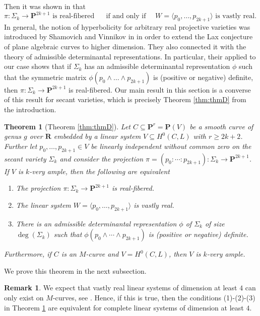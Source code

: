 \documentclass[12pt]{amsart}
\newcounter{conj}
\newcounter{thmcounter}
\numberwithin{equation}{section}
\numberwithin{thmcounter}{section}
\newtheorem{theorem}[thmcounter]{Theorem}
\theoremstyle{definition}
\newtheorem{remark}[thmcounter]{Remark}
\theoremstyle{claim}
\newcommand{\nR}{\mathbf{R}}
\newcommand{\nP}{\mathbf{P}}
\begin{document}
Then it was shown in \cite[Theorem 4.6]{kummersinn} that 
\[ \pi\colon \Sigma_k \to \nP^{2k+1} \text{ is real-fibered } \quad  \text{ if and only if } \quad  W=\langle p_0,\ldots,p_{2k+1} \rangle \text{ is vastly real. } \]
In general, the notion of hyperbolicity for arbitrary real projective varieties was introduced by Shamovich and Vinnikov in \cite{shamovichvinnikov} in order to extend the Lax conjecture of plane algebraic curves to higher dimension. They also connected it with the theory of admissible determinantal representations. In particular, their \cite[Proposition 3.12]{shamovichvinnikov} applied to our case shows that if $\Sigma_k$ has an admissible determinantal representation $\phi$ such that the symmetric matrix $\phi(p_0\wedge \ldots \wedge p_{2k+1})$ is (positive or negative) definite, then $\pi\colon \Sigma_k\to \nP^{2k+1}$ is real-fibered. Our main result in this section is a converse of this result for secant varieties, which is precisely Theorem \ref{thm:thmD} from the introduction.

\begin{theorem}[Theorem \ref{thm:thmD}]\label{thm:definitedetrep}
	Let $C\subseteq \nP^r = \nP(V)$ be a smooth curve of genus $g$ over $\nR$ embedded by a linear system $V\subseteq H^0(C,L)$ with $r\geq 2k+2$. Further let $p_0,\ldots,p_{2k+1}\in V$ be linearly independent without common zero on the secant variety $\Sigma_k$ and consider the projection $\pi = (p_0:\cdots:p_{2k+1})\colon \Sigma_k\to \nP^{2k+1}$. If $V$ is $k$-very ample, then the following are equivalent
	\begin{enumerate}
		\item The projection $\pi\colon \Sigma_k \rightarrow \nP^{2k+1}$ is real-fibered.
		\item The linear system $W=\langle p_0,\ldots,p_{2k+1} \rangle$ is vastly real.
		\item There is an admissible determinantal representation $\phi$ of $\Sigma_k$ of size $\deg(\Sigma_k)$ such that $\phi(p_0\wedge \cdots \wedge p_{2k+1})$ is (positive or negative) definite. 
	\end{enumerate}
Furthermore, if $C$ is an $M$-curve and $V=H^0(C,L)$, then $V$ is $k$-very ample.
\end{theorem}

We prove this theorem in the next subsection.

\begin{remark}
	We expect that vastly real linear systems of dimension at least $4$ can only exist on $M$-curves, see \cite[Remark 4.7]{kummersinn}. Hence, if this is true, then the conditions (1)-(2)-(3) in Theorem \ref{thm:definitedetrep} are equivalent for complete linear systems of dimension at least $4$.
\end{remark}
	
\end{document}
